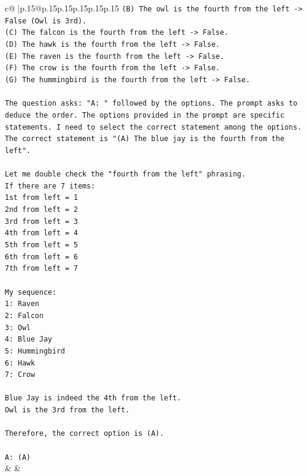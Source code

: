 \documentclass{article}
\begin{document}
{\begin{supertabular}{c@{$\;$}|p{.15\linewidth}@{}p{.15\linewidth}p{.15\linewidth}p{.15\linewidth}p{.15\linewidth}p{.15\linewidth}}
{{{\texttt{(B) The owl is the fourth from the left {-}> False (Owl is 3rd).} \\
\texttt{(C) The falcon is the fourth from the left {-}> False.} \\
\texttt{(D) The hawk is the fourth from the left {-}> False.} \\
\texttt{(E) The raven is the fourth from the left {-}> False.} \\
\texttt{(F) The crow is the fourth from the left {-}> False.} \\
\texttt{(G) The hummingbird is the fourth from the left {-}> False.} \\
\\ 
\texttt{The question asks: "A: " followed by the options. The prompt asks to deduce the order. The options provided in the prompt are specific statements. I need to select the correct statement among the options.} \\
\texttt{The correct statement is "(A) The blue jay is the fourth from the left".} \\
\\ 
\texttt{Let me double check the "fourth from the left" phrasing.} \\
\texttt{If there are 7 items:} \\
\texttt{1st from left = 1} \\
\texttt{2nd from left = 2} \\
\texttt{3rd from left = 3} \\
\texttt{4th from left = 4} \\
\texttt{5th from left = 5} \\
\texttt{6th from left = 6} \\
\texttt{7th from left = 7} \\
\\ 
\texttt{My sequence:} \\
\texttt{1: Raven} \\
\texttt{2: Falcon} \\
\texttt{3: Owl} \\
\texttt{4: Blue Jay} \\
\texttt{5: Hummingbird} \\
\texttt{6: Hawk} \\
\texttt{7: Crow} \\
\\ 
\texttt{Blue Jay is indeed the 4th from the left.} \\
\texttt{Owl is the 3rd from the left.} \\
\\ 
\texttt{Therefore, the correct option is (A).} \\
\\ 
\texttt{A: (A)} \\
            }
        }
    }
    & & \\ \\


\end{supertabular}}
\end{document}
